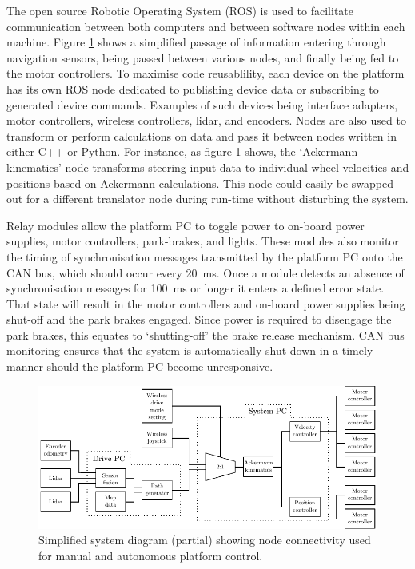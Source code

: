 \documentclass[preprint,authoryear,12pt]{elsarticle}
\begin{document}
        The open source Robotic Operating System (ROS) is used to facilitate communication between both computers and between software nodes within each machine.
        Figure \ref{fig:system_diagram_software} shows a simplified passage of information entering through navigation sensors, being passed between various nodes, and finally being fed to the motor controllers.
        To maximise code reusablility, each device on the platform has its own ROS node dedicated to publishing device data or subscribing to generated device commands.
        Examples of such devices being interface adapters, motor controllers, wireless controllers, lidar, and encoders.
        Nodes are also used to transform or perform calculations on data and pass it between nodes written in either C++ or Python.
        For instance, as figure \ref{fig:system_diagram_software} shows, the `Ackermann kinematics' node transforms steering input data to individual wheel velocities and positions based on Ackermann calculations.
        This node could easily be swapped out for a different translator node during run-time without disturbing the system.

        Relay modules allow the platform PC to toggle power to on-board power supplies, motor controllers, park-brakes, and lights.
        These modules also monitor the timing of synchronisation messages transmitted by the platform PC onto the CAN bus, which should occur every \SI{20}{\milli\second}.
        Once a module detects an absence of synchronisation messages for \SI{100}{\milli\second} or longer it enters a defined error state.
        That state will result in the motor controllers and on-board power supplies being shut-off and the park brakes engaged.
        Since power is required to disengage the park brakes, this equates to `shutting-off' the brake release mechanism.
        CAN bus monitoring ensures that the system is automatically shut down in a timely manner should the platform PC become unresponsive.

        \begin{figure}[htb]
            \centering
            \includegraphics[width=\linewidth]{imgs/system_diagram/software.pdf}
            \caption{Simplified system diagram (partial) showing node connectivity used for manual and autonomous platform control.}
            \label{fig:system_diagram_software}
        \end{figure}
\end{document}
